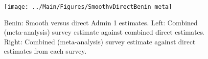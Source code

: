 \documentclass[12pt]{article}\usepackage[]{graphicx}\usepackage[]{color}
\newenvironment{knitrout}{}{} %
\begin{document}

\begin{knitrout}
\color{fgcolor}\begin{figure}[bht]

{\centering \texttt{[image: ../Main/Figures/SmoothvDirectBenin\_meta]} 

}

\caption[Benin]{Benin: Smooth versus direct Admin 1 estimates. Left: Combined (meta-analysis) survey estimate against combined direct estimates. Right: Combined (meta-analysis) survey estimate against direct estimates from each survey.}\label{fig:unnamed-chunk-13}
\end{figure}


\end{knitrout}
\end{document}
